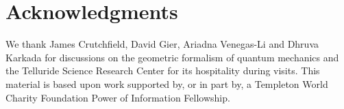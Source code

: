 \documentclass[draft,nofootinbib,pre,twocolumn,showpacs,showkeys,preprintnumbers,floatfix]{revtex4-1}
\newcommand{\1}{\mathbbm{1}}
\begin{document}
\section*{Acknowledgments}
\label{sec:acknowledgments}

We thank James Crutchfield, David Gier, Ariadna Venegas-Li and Dhruva Karkada
for discussions on the geometric formalism of quantum mechanics and the Telluride
Science Research Center for its hospitality during visits.  This material is
based upon work supported by, or in part by, a Templeton World Charity
Foundation Power of Information Fellowship.

\newpage

\end{document}
